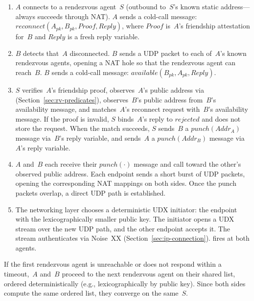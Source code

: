 \begin{enumerate}
\item $A$ connects to a rendezvous agent~$S$ (outbound to~$S$'s known static address---always succeeds through NAT).  $A$ sends a cold-call message: $\mathit{reconnect}(A_{\mathit{pk}}, B_{\mathit{pk}}, \mathit{Proof}, \mathit{Reply})$, where $\mathit{Proof}$ is~$A$'s friendship attestation for~$B$ and $\mathit{Reply}$ is a fresh reply variable.

\item $B$ detects that~$A$ disconnected.  $B$ sends a UDP packet to each of~$A$'s known rendezvous agents, opening a NAT hole so that the rendezvous agent can reach~$B$.  $B$ sends a cold-call message: $\mathit{available}(B_{\mathit{pk}}, A_{\mathit{pk}}, \mathit{Reply})$.

\item $S$ verifies~$A$'s friendship proof, observes~$A$'s public address via
 (Section~\ref{sec:rv-predicates}), observes~$B$'s
public address from~$B$'s availability message, and matches~$A$'s reconnect
request with~$B$'s availability message. If the proof is invalid, $S$
binds~$A$'s reply to $\mathit{rejected}$ and does not store the request. When the match succeeds, $S$ sends~$B$ a
$\mathit{punch}(\mathit{Addr}_A)$ message via~$B$'s reply variable, and sends~$A$ a $\mathit{punch}(\mathit{Addr}_B)$ message via~$A$'s reply variable.

\item $A$ and~$B$ each receive their $\mathit{punch}(\cdot)$ message and call
 toward the other's observed public address. Each endpoint
sends a short burst of UDP packets, opening the corresponding NAT mappings on
both sides. Once the punch packets overlap, a direct UDP path is established.

\item The networking layer chooses a deterministic UDX initiator: the endpoint with the lexicographically
smaller public key. The initiator opens a UDX stream over the new UDP path, and the other endpoint accepts it. The stream authenticates via Noise~XX
(Section~\ref{sec:ip-connection}).  fires at both agents.
\end{enumerate}

If the first rendezvous agent is unreachable or does not respond within a timeout,~$A$ and~$B$ proceed to the next rendezvous agent on their shared list, ordered deterministically (e.g., lexicographically by public key).  Since both sides compute the same ordered list, they converge on the same~$S$.


